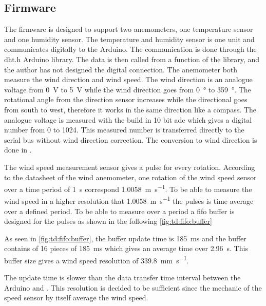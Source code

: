 \subsection{Firmware}
The firmware is designed to support two anemometers, one temperature sensor and one humidity sensor.
The temperature and humidity sensor is one unit and communicates digitally to the Arduino. The communication is done through the dht.h Arduino library. The data is then called from a function of the library, and the author has not designed the digital connection. 
The anemometer both measure the wind direction and wind speed. The wind direction is an analogue voltage from \SI{0}{\volt} to \SI{5}{\volt} while the wind direction goes from \SI{0}{\degree} to \SI{359}{\degree}. The rotational angle from the direction sensor increases while the directional goes from south to west, therefore it works in the same direction like a compass. The analogue voltage is measured with the build in 10 bit \gls{adc} which gives a digital number from 0 to 1024. This measured number is transferred directly to the serial bus without wind direction correction. The conversion to wind direction is done in \matlab. 

The wind speed measurement sensor gives a pulse for every rotation. According to the datasheet of the wind anemometer, one rotation of the wind speed sensor over a time period of \SI{1}{\second} correspond \SI{1.0058}{\meter\per\second}. To be able to measure the wind speed in a higher resolution that \SI{1.0058}{\meter\per\second} the pulses is time average over a defined period. To be able to measure over a period a \gls{fifo} buffer is designed for the pulses as shown in the following \autoref{fig:td:fifo:buffer} 

As seen in \autoref{fig:td:fifo:buffer}, the buffer update time is \SI{185}{\milli\second} and the buffer contains of 16 pieces of \SI{185}{\milli\second} which gives an average time over \SI{2.96}{\second}. This buffer size gives a wind speed resolution of \SI{339.8}{\milli\meter\per\second}. 

The update time is slower than the data transfer time interval between the Arduino and \matlab.  This resolution is decided to be sufficient since the mechanic of the speed sensor by itself average the wind speed.

